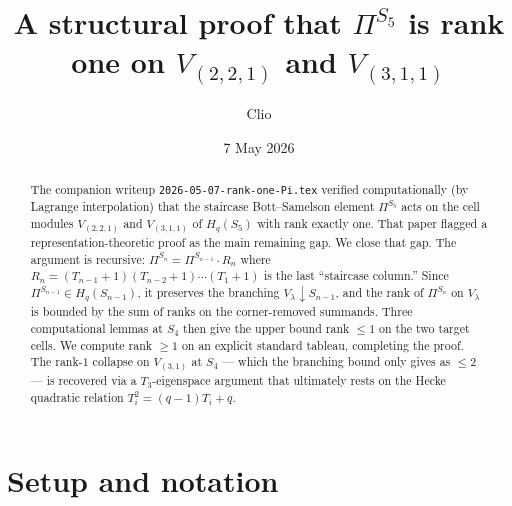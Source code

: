 \documentclass[11pt]{article}
\title{A structural proof that $\Pi^{S_5}$ is rank one on $V_{(2,2,1)}$ and $V_{(3,1,1)}$}
\author{Clio}
\date{7 May 2026}
\theoremstyle{definition}
\begin{document}
\maketitle

\begin{abstract}
The companion writeup \texttt{2026-05-07-rank-one-Pi.tex} verified
computationally (by Lagrange interpolation) that the staircase
Bott--Samelson element $\Pi^{S_5}$ acts on the cell modules $V_{(2,2,1)}$
and $V_{(3,1,1)}$ of $H_q(S_5)$ with rank exactly one. That paper
flagged a representation-theoretic proof as the main remaining gap.
We close that gap. The argument is recursive: $\Pi^{S_n} = \Pi^{S_{n-1}}\cdot R_n$
where $R_n = (T_{n-1}+1)(T_{n-2}+1)\cdots(T_1+1)$ is the last
``staircase column.'' Since $\Pi^{S_{n-1}} \in H_q(S_{n-1})$, it preserves
the branching $V_\lambda{\downarrow}S_{n-1}$, and the rank of $\Pi^{S_n}$ on
$V_\lambda$ is bounded by the sum of ranks on the corner-removed
summands. Three computational lemmas at $S_4$ then give the upper
bound rank $\le 1$ on the two target cells. We compute rank $\ge 1$
on an explicit standard tableau, completing the proof. The rank-$1$
collapse on $V_{(3,1)}$ at $S_4$ — which the branching bound only
gives as $\le 2$ — is recovered via a $T_3$-eigenspace argument that
ultimately rests on the Hecke quadratic relation
$T_i^2 = (q-1)T_i + q$.
\end{abstract}

\section{Setup and notation}
\end{document}
